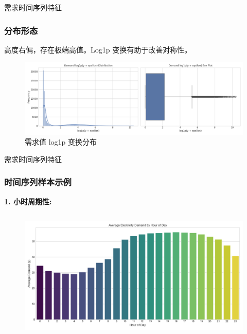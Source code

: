 \documentclass{beamer} %
\begin{document}
\begin{frame}{需求时间序列特征}
    \frametitle{分布形态}

    高度右偏，存在极端高值。Log1p 变换有助于改善对称性。
    \begin{figure}[H]
        \centering
        \includegraphics[width=\textwidth]{../plots/demand_y_distribution_log1p_scale.png}
        \caption{需求值 log1p 变换分布}
    \end{figure}
\end{frame}

\begin{frame}{需求时间序列特征}
    \frametitle{时间序列样本示例}
    \textbf{1. 小时周期性:}
    \begin{columns}
        \begin{column}{0.9\textwidth}
            \centering
            \begin{figure}
                \includegraphics[width=\textwidth]{../plots/avg_demand_by_hour_spark.png}
            \end{figure}
        \end{column}
    \end{columns}
\end{frame}
\end{document}
